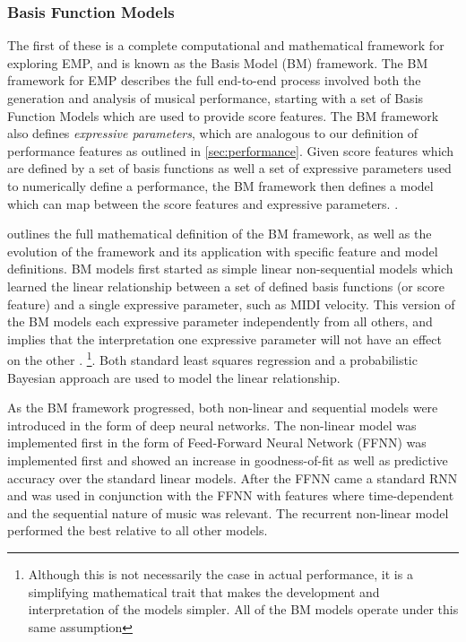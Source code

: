 \subsubsection{Basis Function Models}
The first of these is a complete computational and mathematical framework for exploring EMP, and is known as the Basis Model (BM) framework\cite{eduardo2018computational}. The BM framework for EMP describes the full end-to-end process involved both the generation and analysis of musical performance, starting with a set of Basis Function Models which are used to provide score features. The BM framework also defines \emph{expressive parameters}, which are analogous to our definition of performance features as outlined in \ref{sec:performance}. Given score features which are defined by a set of basis functions as well a set of expressive parameters used to numerically define a performance, the BM framework then defines a model which can map between the score features and expressive parameters. . 

\citet{eduardo2018computational} outlines the full mathematical definition of the BM framework, as well as the evolution of the framework and its application with specific feature and model definitions. BM models first started as simple linear non-sequential models which learned the linear relationship between a set of defined basis functions (or score feature)  and a single expressive parameter, such as MIDI velocity. This version of the BM models each expressive parameter independently from all others, and implies that the interpretation one expressive parameter will not have an effect on the other . \footnote{Although this is not necessarily the case in actual performance, it is a simplifying mathematical trait that makes the development and interpretation of the models simpler. All of the BM models operate under this same assumption}. Both standard least squares regression and a probabilistic Bayesian approach are used to model the linear relationship. 

As the BM framework progressed, both non-linear and sequential models were introduced in the form of deep neural networks. The non-linear model was implemented first in the form of Feed-Forward Neural Network (FFNN) was implemented first and showed an increase in goodness-of-fit as well as predictive accuracy over the standard linear models. After the FFNN came a standard RNN and was used in conjunction with the FFNN with features where time-dependent and the sequential nature of music was relevant. The recurrent non-linear model performed the best relative to all other models. 

